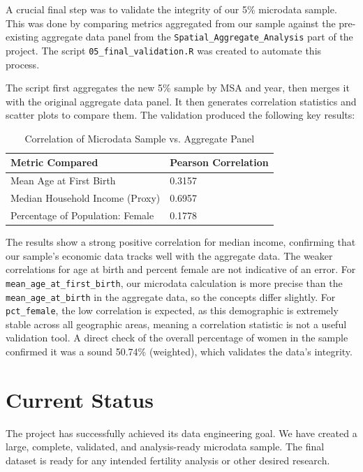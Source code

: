 \documentclass{article}
\begin{document}
A crucial final step was to validate the integrity of our 5\% microdata sample. This was done by comparing metrics aggregated from our sample against the pre-existing aggregate data panel from the \texttt{Spatial\_Aggregate\_Analysis} part of the project. The script \texttt{05\_final\_validation.R} was created to automate this process.

The script first aggregates the new 5\% sample by MSA and year, then merges it with the original aggregate data panel. It then generates correlation statistics and scatter plots to compare them. The validation produced the following key results:

\begin{table}[h!]
\centering
\caption{Correlation of Microdata Sample vs. Aggregate Panel}
\label{tab:validation}
\begin{tabular}{@{}ll@{}}
\toprule
Metric Compared                      & Pearson Correlation \\ \midrule
Mean Age at First Birth              & 0.3157              \\
Median Household Income (Proxy)      & 0.6957              \\
Percentage of Population: Female     & 0.1778              \\ \bottomrule
\end{tabular}
\end{table}

The results show a strong positive correlation for median income, confirming that our sample's economic data tracks well with the aggregate data. The weaker correlations for age at birth and percent female are not indicative of an error. For \texttt{mean\_age\_at\_first\_birth}, our microdata calculation is more precise than the \texttt{mean\_age\_at\_birth} in the aggregate data, so the concepts differ slightly. For \texttt{pct\_female}, the low correlation is expected, as this demographic is extremely stable across all geographic areas, meaning a correlation statistic is not a useful validation tool. A direct check of the overall percentage of women in the sample confirmed it was a sound 50.74\% (weighted), which validates the data's integrity.

\section{Current Status}
The project has successfully achieved its data engineering goal. We have created a large, complete, validated, and analysis-ready microdata sample. The final dataset is ready for any intended fertility analysis or other desired research.
\end{document}
